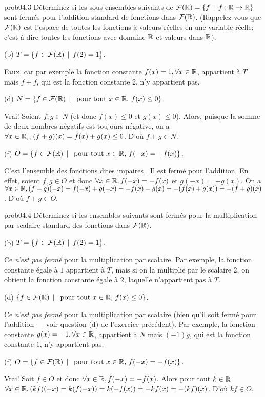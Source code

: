 \bigskip
\begin{sol}{prob04.3}  Déterminez si les
sous-ensembles suivants de $\mathcal{F}(\mathbb{R})=\{f \, \mid \, f: \mathbb{R} \to \mathbb{R}\}$ sont
fermés pour l'addition standard de fonctions dans $\mathcal{F}(\mathbb{R})$.
(Rappelez-vous que $\mathcal{F}(\mathbb{R})$ est l'espace de toutes les fonctions à
valeurs réelles en une variable réelle; c'est-à-dire toutes les fonctions
avec domaine $\mathbb{R}$ et valeurs dans $\mathbb{R}$).

\medskip
(b) $T=\{f \in \mathcal{F}(\mathbb{R}) \, \mid \, f(2)=1 \}$.

\soln Faux, car par exemple la fonction constante
$f(x)=1, \forall x\in \mathbb{R}$, appartient à $T$ mais $f+f$, qui est la
fonction constante $2$, n'y appartient pas. 

\medskip
(d) $N=\{f \in \mathcal{F}(\mathbb{R}) \, \mid \, \text{ pour tout } x\in \mathbb{R},   \, f(x)\le 0\}$.

\soln Vrai! Soient $f, g \in N$ (et donc $f(x)\le 0$ et
$g(x)\le 0$). Alors, puisque la somme de deux nombres n\'egatifs
est toujours n\'egative, on a
$\forall x \in \mathbb{R},, (f+g)(x)= f(x)+g(x)\le 0$. D'où $f+g\in N$.  

\medskip
(f) $O=\{f \in \mathcal{F}(\mathbb{R}) \, \mid \, \text{ pour tout } x\in \mathbb{R},   \, f(-x)= -f(x)\}$.

\soln C'est l'ensemble des fonctions dites \og impaires \fg. Il est
fermé pour l'addition. En effet, soient $f,g \in O$ et donc
$\forall x \in \mathbb{R}, f(-x)= -f(x)$ et $g(-x)= -g(x)$. On a 
$\forall x \in \mathbb{R}, (f+g)(-x)=f(-x)+g(-x)=-f(x)-g(x)=-(f(x)+g(x))=-(f+g)(x)$.
D'où $f+g\in O$.
\medskip
\end{sol}

\bigskip
\begin{sol}{prob04.4} Déterminez si les
ensembles suivants sont fermés pour la multiplication par scalaire standard des fonctions dans $\mathcal{F}(\mathbb{R})$.

\medskip
(b) $T=\{f \in \mathcal{F}(\mathbb{R}) \, \mid \, f(2)=1 \}$.

\soln Ce {\emph{n'est pas fermé}} pour la multiplication par scalaire.
Par exemple, la fonction constante égale à $1$ appartient à $T$, mais si on
la multiplie par le scalaire 2, on obtient la fonction
constante égale à $2$, laquelle n'appartient pas à $T$. 

\medskip
(d) $\{f \in \mathcal{F}(\mathbb{R}) \, \mid \, \text{ pour tout } x\in \mathbb{R},   \, f(x)\le 0\}$.

\soln Ce {\emph{n'est pas fermé}} pour la multiplication par scalaire 
(bien qu'il soit fermé pour l'addition --- voir question (d) de l'exercice
précédent). Par exemple, la fonction constante
$g(x)=-1, \forall x\in \mathbb{R}$, appartient à $N$ mais $(-1)g$, qui est
la fonction constante $1$, n'y appartient pas.

\medskip
(f) $O=\{f \in \mathcal{F}(\mathbb{R}) \, \mid \, \text{ pour tout } x\in \mathbb{R},   \, f(-x)= -f(x)\}$.

\soln Vrai! Soit $f \in O$ et donc
$\forall x \in \mathbb{R}, f(-x)= -f(x)$. Alors pour tout $k\in \mathbb{R}$ 
$\forall x \in \mathbb{R}, (kf)(-x)=k (f(-x))=k(-f(x))=-kf(x)=-(kf)(x)$. D'où
$kf\in O$.
\medskip
\end{sol}

